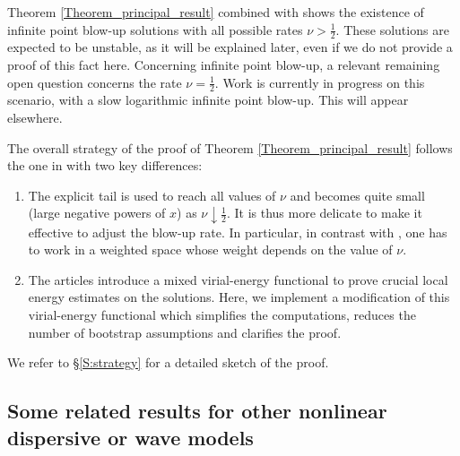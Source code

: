 \documentclass[16pt,english, oneside,reqno]{smfart}
\begin{document}
Theorem \ref{Theorem_principal_result} combined with \cite[Theorem 1]{MMPIII}
shows the existence of infinite point blow-up solutions with all possible rates $\nu>\frac 12$. These solutions are expected to be unstable, as it will be explained later, 
even if we do not provide a proof of this fact here.
Concerning infinite point blow-up, a relevant remaining open question concerns the rate $\nu =\frac12$. Work is currently in progress on this scenario, with a slow logarithmic infinite point blow-up. This will appear elsewhere.

The overall strategy of the proof of Theorem \ref{Theorem_principal_result}
follows the one in \cite{MMPIII} with two key differences:
\begin{enumerate}
    \item The explicit tail is used to reach all values of $\nu$ 
    and becomes quite small (large negative powers of $x$) as $\nu\downarrow \frac 12$.
    It is thus more delicate to make it effective to adjust the blow-up rate.
    In particular, in contrast with \cite{MMPIII}, one has to work in a weighted space
    whose weight depends on the value of $\nu$.
    \item The articles \cite{MMPI,MMPII,MMPIII} introduce a mixed virial-energy functional to prove crucial local energy estimates on the solutions.
    Here, we implement a modification of this virial-energy functional which simplifies the computations, reduces the number of bootstrap assumptions and clarifies the proof.
\end{enumerate}
We refer to \S \ref{S:strategy} for a detailed sketch of the proof.

\subsection{Some related results for other nonlinear dispersive or wave models}
\end{document}
